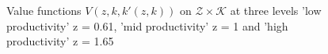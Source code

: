 \documentclass[12pt,english]{article}
\theoremstyle{remark}
\begin{document}
\begin{figure}
		\caption{Value functions $V(z,k,k'(z,k))$ on $\mathcal{Z} \times \mathcal{K}$ at three levels 'low productivity' z = 0.61, 'mid productivity' z = 1 and 'high productivity' z = 1.65}
		\label{fig:main}
	\end{figure}

	\begin{figure}
		\begin{minipage}{.5\linewidth}
			\centering
		\end{minipage}%
		\begin{minipage}{.5\linewidth}
			\centering
		\end{minipage}\par\medskip
		\centering

\end{figure}
\end{document}
